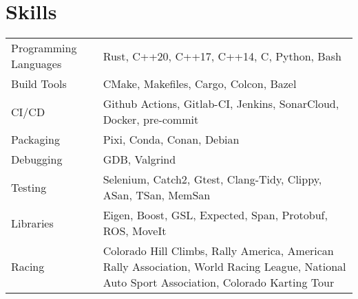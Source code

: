 \documentclass[a4paper,12pt]{article}
\begin{document}
\section{Skills}
\begin{tabularx}{\linewidth}{@{}l X@{}}
Programming Languages &  \normalsize{Rust, C++20, C++17, C++14, C, Python, Bash}\\
Build Tools &  \normalsize{CMake, Makefiles, Cargo, Colcon, Bazel}\\
CI\slash CD  &  \normalsize{Github Actions, Gitlab-CI, Jenkins, SonarCloud, Docker, pre-commit}\\
Packaging  &  \normalsize{Pixi, Conda, Conan, Debian}\\
Debugging  &  \normalsize{GDB, Valgrind}\\
Testing  &  \normalsize{Selenium, Catch2, Gtest, Clang-Tidy, Clippy, ASan, TSan, MemSan}\\
Libraries  &  \normalsize{Eigen, Boost, GSL, Expected, Span, Protobuf, ROS, MoveIt}\\
Racing  &  \normalsize{Colorado Hill Climbs, Rally America, American Rally Association, World Racing League, National Auto Sport Association, Colorado Karting Tour}\\
\end{tabularx}
\end{document}
